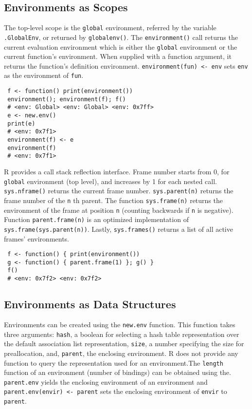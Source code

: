 \documentclass[10pt,review,sigplan,anonymous=true,authorversion=true,nonacm=true]{acmart}
\newcommand{\code}[1]{\lstinline |#1|\xspace}
\newcommand{\newEnv}{\code{new.env}}
\newcommand{\parentEnv}{\code{parent.env}}
\begin{document}
\subsection{Environments as Scopes}
The top-level scope is the \code{global} environment, referred by the variable
\code{.GlobalEnv}, or returned by \code{globalenv()}. The \code{environment()}
call returns the current evaluation environment which is either the
\code{global} environment or the current function's environment. When supplied
with a function argument, it returns the function's definition environment.
\code{environment(fun) <- env} sets \code{env} as the environment of \code{fun}.

\begin{lstlisting}
 f <- function() print(environment())
 environment(); environment(f); f()
 # <env: Global> <env: Global> <env: 0x7ff>
 e <- new.env()
 print(e)
 # <env: 0x7f1>
 environment(f) <- e
 environment(f)
 # <env: 0x7f1>
\end{lstlisting}

\noindent
R provides a call stack reflection interface. Frame number starts from 0, for
\code{global} environment (top level), and increases by 1 for each nested call.
\code{sys.nframe()} returns the current frame number. \code{sys.parent(n)}
returns the frame number of the \code{n}th parent. The function
\code{sys.frame(n)} returns the environment of the frame at position \code{n}
(counting backwards if \code{n} is negative). Function \code{parent.frame(n)} is
an optimized implementation of \code{sys.frame(sys.parent(n))}. Lastly,
\code{sys.frames()} returns a list of all active frames' environments.

\begin{lstlisting}
 f <- function() { print(environment())
 g <- function() { parent.frame(1) }; g() }
 f()
 # <env: 0x7f2> <env: 0x7f2>
\end{lstlisting}

\subsection{Environments as Data Structures}
Environments can be created using the \newEnv function. This function takes
three arguments: \code{hash}, a boolean for selecting a hash table
representation over the default association list representation, \code{size}, a
number specifying the size for preallocation, and, \code{parent}, the enclosing
environment. R does not provide any function to query the representation used
for an environment.The \code{length} function of an environment (number of
bindings) can be obtained using the. \parentEnv yields the enclosing environment
of an environment and \code{parent.env(envir) <- parent} sets the enclosing
environment of \code{envir} to \code{parent}.
\end{document}
